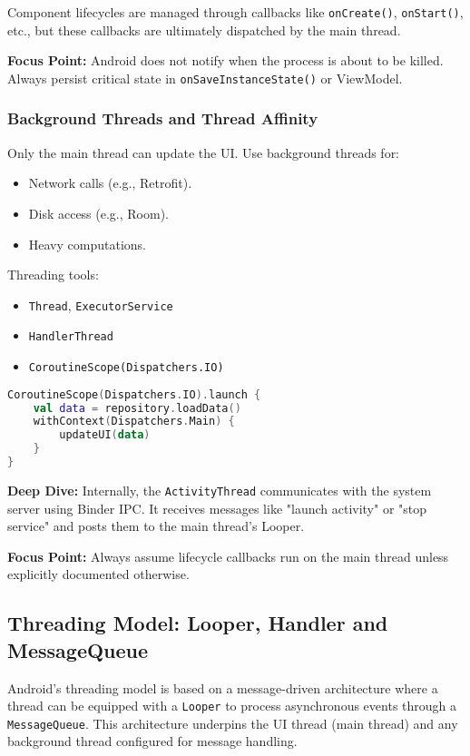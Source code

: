 \documentclass[a4paper,12pt]{article}
\begin{document}
Component lifecycles are managed through callbacks like \texttt{onCreate()}, \texttt{onStart()}, etc., but these callbacks are ultimately dispatched by the main thread.

\textbf{Focus Point:} Android does not notify when the process is about to be killed. Always persist critical state in \texttt{onSaveInstanceState()} or ViewModel.

\subsubsection{Background Threads and Thread Affinity}

Only the main thread can update the UI. Use background threads for:
\begin{itemize}
  \item Network calls (e.g., Retrofit).
  \item Disk access (e.g., Room).
  \item Heavy computations.
\end{itemize}

Threading tools:
\begin{itemize}
  \item \texttt{Thread}, \texttt{ExecutorService}
  \item \texttt{HandlerThread}
  \item \texttt{CoroutineScope(Dispatchers.IO)}
\end{itemize}

\begin{lstlisting}[language=Kotlin]
CoroutineScope(Dispatchers.IO).launch {
    val data = repository.loadData()
    withContext(Dispatchers.Main) {
        updateUI(data)
    }
}
\end{lstlisting}

\textbf{Deep Dive:} Internally, the \texttt{ActivityThread} communicates with the system server using Binder IPC. It receives messages like "launch activity" or "stop service" and posts them to the main thread's Looper.

\textbf{Focus Point:} Always assume lifecycle callbacks run on the main thread unless explicitly documented otherwise.

\subsection{Threading Model: Looper, Handler and MessageQueue}

Android’s threading model is based on a message-driven architecture where a thread can be equipped with a \texttt{Looper} to process asynchronous events through a \texttt{MessageQueue}. This architecture underpins the UI thread (main thread) and any background thread configured for message handling.
\end{document}
